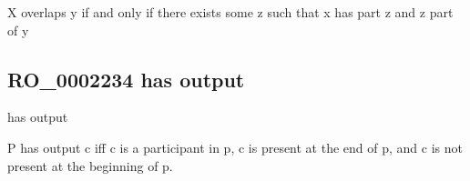 \documentclass[letterpaper,10pt,english]{sphinxmanual}
\begin{document}
\begin{sphinxShadowBox}

\sphinxAtStartPar
{\hyperref[\detokenize{doc-RO_0002323::doc}]{}}
\end{sphinxShadowBox}

\begin{sphinxShadowBox}

\sphinxAtStartPar
X overlaps y if and only if there exists some z such that x has part z and z part of y
\end{sphinxShadowBox}

\begin{sphinxShadowBox}

\sphinxAtStartPar
{}
\end{sphinxShadowBox}
\begin{quote}

\ignorespaces \end{quote}


\subsection{RO\_0002234 \sphinxhyphen{} has output}
\label{\detokenize{doc-RO_0002234:ro-0002234-has-output}}\label{\detokenize{doc-RO_0002234:index-0}}\label{\detokenize{doc-RO_0002234::doc}}
\begin{sphinxShadowBox}

\sphinxAtStartPar
has output
\end{sphinxShadowBox}

\begin{sphinxShadowBox}

\sphinxAtStartPar
{}
\end{sphinxShadowBox}

\begin{sphinxShadowBox}

\sphinxAtStartPar
P has output c iff c is a participant in p, c is present at the end of p, and c is not present at the beginning of p.
\end{sphinxShadowBox}
\end{document}
